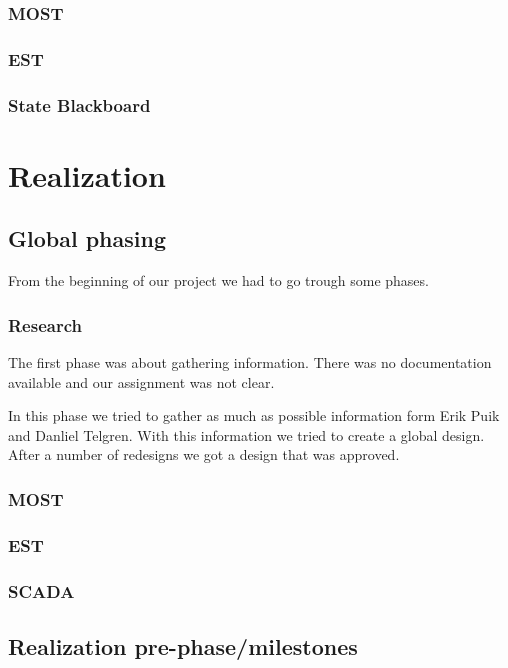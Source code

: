\documentclass[12pt,a4paper]{report}
\begin{document}
\subsection{MOST}

\subsection{EST}

\subsection{State Blackboard}

\chapter{Realization}
\section{Global phasing}
From the beginning of our project we had to go trough some phases.

\subsection{Research}
The first phase was about gathering information.
There was no documentation available and our assignment was not clear.

In this phase we tried to gather as much as possible information form Erik Puik and Danliel Telgren.
With this information we tried to create a global design.
After a number of redesigns we got a design that was approved.

\subsection{MOST}


\subsection{EST}

\subsection{SCADA}

\section{Realization pre-phase/milestones}
\end{document}
